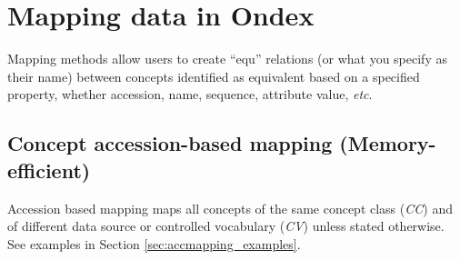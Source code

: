 \chapter{Mapping data in Ondex}
\label{cha:map}

Mapping methods allow users to create ``equ'' relations (or what you specify as their name) between concepts identified as equivalent
based on a specified property, whether accession, name, sequence, attribute value, {\it{etc}}.


\section{Concept accession-based mapping (Memory-efficient)} 
\label{sec:accmapping}
Accession based mapping maps all concepts of the same concept class ({\em{CC}})
and of different data source or controlled vocabulary ({\em{CV}}) unless stated otherwise.	
See examples in Section \ref{sec:accmapping_examples}.
	
